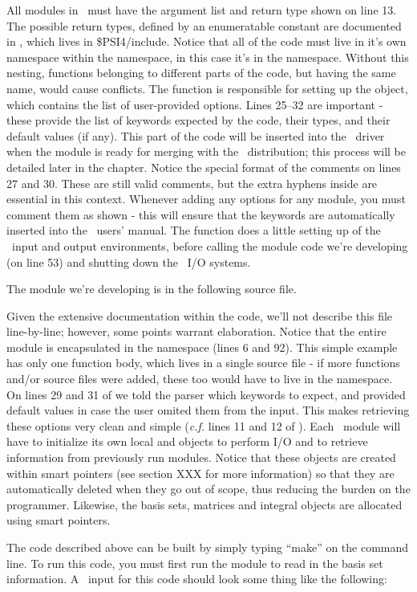 All modules in \PSIfour\ must have the argument list and return type shown on
line 13.  The possible return types, defined by an enumeratable constant are
documented in , which lives in \$PSI4/include.  Notice that
all of the code must live in it's own namespace within the 
namespace, in this case it's in the  namespace.  Without
this nesting, functions belonging to different parts of the code, but having
the same name, would cause conflicts.  The  function is
responsible for setting up the  object, which contains the list
of user-provided options.  Lines 25--32 are important - these provide the list
of keywords expected by the code, their types, and their default values (if
any).  This part of the code will be inserted into the \PSIfour\ driver when
the module is ready for merging with the \PSIfour\ distribution; this process
will be detailed later in the chapter.  Notice the special format of the
comments on lines 27 and 30.  These are still valid  comments, but
the extra hyphens inside are essential in this context.  Whenever adding any
options for any module, you must comment them as shown - this will ensure that
the keywords are automatically inserted into the \PSIfour\ users' manual.  The
 function does a little setting up of the \PSI\ input and output
environments, before calling the module code we're developing (on line 53) and
shutting down the \PSIfour\ I/O systems.

The module we're developing is in the following source file.


Given the extensive documentation within the code, we'll not describe this file
line-by-line; however, some points warrant elaboration.  Notice that the entire
module is encapsulated in the  namespace (lines 6 and
92).  This simple example has only one function body, which lives in a single
source file - if more functions and/or source files were added, these too would
have to live in the  namespace.  On lines 29 and 31 of
 we told the parser which keywords to expect, and provided
default values in case the user omited them from the input.  This makes
retrieving these options very clean and simple ({\it c.f.} lines 11 and 12 of
).  Each \PSIfour\ module will have to initialize its own
local  and  objects to perform I/O and to retrieve
information from previously run modules.  Notice that these objects are created
within smart pointers (see section XXX for more information) so that they are
automatically deleted when they go out of scope, thus reducing the burden on
the programmer.  Likewise, the basis sets, matrices and integral objects are
allocated using smart pointers.

The code described above can be built by simply typing ``make'' on the command
line.  To run this code, you must first run the  module to read
in the basis set information.  A \PSI\ input for this code should look some
thing like the following:

